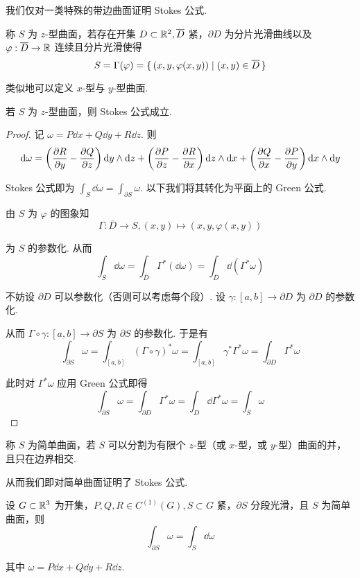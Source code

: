 我们仅对一类特殊的带边曲面证明 Stokes 公式.

\begin{definition}
    称 $S$ 为 $z$-型曲面，若存在开集 $D\subset\mathbb{R}^2,\overline{D}$ 紧，$\partial D$ 为分片光滑曲线以及 $\varphi:\overline{D}\to\mathbb{R}$ 连续且分片光滑使得
$$
S=\Gamma(\varphi)=\set{(x,y,\varphi(x,y))|(x,y)\in\overline{D}}
$$
\end{definition}


类似地可以定义 $x$-型与 $y$-型曲面.

\begin{lemma}
    若 $S$ 为 $z$-型曲面，则 Stokes 公式成立.
\end{lemma}
\begin{proof}
    记 $\omega=P\dd x+Q\dd y+R\dd z$. 则
$$
\mathrm{d}\omega=\left(\frac{\partial{R}}{\partial{y}}-\frac{\partial{Q}}{\partial{z}}\right)\mathrm{d} y\wedge\mathrm{d} z+\left(\frac{\partial{P}}{\partial{z}}-\frac{\partial{R}}{\partial{x}}\right)\mathrm{d} z\wedge\mathrm{d} x+\left(\frac{\partial{Q}}{\partial{x}}-\frac{\partial{P}}{\partial{y}}\right)\mathrm{d} x\wedge\mathrm{d} y
$$

    Stokes 公式即为 $\displaystyle\int_S\dd\omega=\int_{\partial S}\omega$. 以下我们将其转化为平面上的 Green 公式.
    
    由 $S$ 为 $\varphi$ 的图象知
$$
\Gamma:\overline{D}\to S,(x,y)\mapsto(x,y,\varphi(x,y))
$$

    为 $S$ 的参数化. 从而
$$
\int_S\dd\omega=\int_{\overline{D}}\Gamma^*(\dd\omega)=\int_{\overline{D}}\dd(\Gamma^*\omega)
$$

    不妨设 $\partial D$ 可以参数化（否则可以考虑每个段）. 设 $\gamma:[a,b]\to\partial D$ 为 $\partial D$ 的参数化.

    从而 $\Gamma\circ\gamma:[a,b]\to\partial S$ 为 $\partial S$ 的参数化. 于是有
$$
\int_{\partial S}\omega=\int_{[a,b]}(\Gamma\circ\gamma)^*\omega=\int_{[a,b]}\gamma^*\Gamma^*\omega=\int_{\partial D}\Gamma^*\omega
$$

    此时对 $\Gamma^*\omega$ 应用 Green 公式即得
$$
\int_{\partial S}\omega=\int_{\partial D}\Gamma^*\omega=\int_D\dd\Gamma^*\omega=\int_S\omega
$$
\end{proof}

\begin{definition}
    称 $S$ 为简单曲面，若 $S$ 可以分割为有限个 $z$-型（或 $x$-型，或 $y$-型）曲面的并，且只在边界相交.
\end{definition}

从而我们即对简单曲面证明了 Stokes 公式.

\begin{property}
    设 $G\subset\mathbb{R}^3$ 为开集，$P,Q,R\in C^{(1)}(G),S\subset G$ 紧，$\partial S$ 分段光滑，且 $S$ 为简单曲面，则
$$
\int_{\partial S}\omega=\int_S\dd\omega
$$

    其中 $\omega=P\dd x+Q\dd y+R\dd z$.
\end{property}

